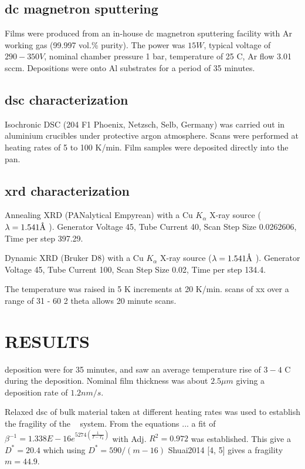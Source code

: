 \documentclass[a4paper,12pt,oneside]{article}%
\begin{document}
\subsection{\acrshort{dc} magnetron sputtering}
Films were produced from an in-house \acrshort{dc} magnetron sputtering facility with Ar working gas (99.997 vol.\% purity). The power was $15W$, typical voltage of $290-350V$, nominal chamber pressure 1 bar, temperature of 25 \degree C, Ar flow 3.01 \gls{sccm}. Depositions were onto Al substrates for a period of 35 minutes. 

\subsection{\acrshort{dsc} characterization}
Isochronic DSC (204 F1 Phoenix, Netzsch, Selb, Germany) was carried out in aluminium crucibles under protective argon atmosphere. Scans were performed at heating rates of 5 to 100 K/min. Film samples were deposited directly into the pan. 

\subsection{\acrshort{xrd} characterization}
Annealing XRD (PANalytical Empyrean) with a Cu $K_{\alpha}$ X-ray source ($\lambda = 1.541 \mbox{\normalfont\AA}$ ). Generator Voltage 45, Tube Current 40, Scan Step Size 0.0262606, Time per step 397.29. 

Dynamic XRD (Bruker D8) with a Cu $K_{\alpha}$ X-ray source ($\lambda = 1.541 \mbox{\normalfont\AA}$ ). Generator Voltage 45, Tube Current 100, Scan Step Size 0.02, Time per step 134.4. 

The temperature was raised in 5 K increments at 20 K/min. scans of xx over a range of 31 - 60 2 theta allows 20 minute scans. 


\section{RESULTS}

deposition were for 35 minutes, and saw an average temperature rise of $3 - 4$ \degree C during the deposition. Nominal film thickness was about $2.5 \mu m$ giving a deposition rate of $1.2 nm/s$.  

Relaxed \gls{dsc} of bulk material taken at different heating rates was used to establish the fragility of the \MgZnCa~ system. From the equations ... a fit of
$\beta^{-1} = 1.338E - 16e^{5274 (\frac{1}{T-T_{0}})}$ with Adj. $R^{2}=0.972$ was established. This give a $D^{*}=20.4$ which using $D^{*}=590/(m-16)$ Shuai2014 [4, 5] gives a fragility $m=44.9$.
\end{document}
